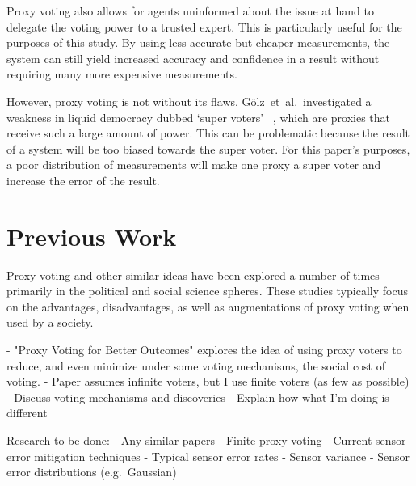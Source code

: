 Proxy voting also allows for agents uninformed about the issue at hand to
delegate the voting power to a trusted expert.
This is particularly useful for the purposes of this study.
By using less accurate but cheaper measurements, the system can still yield
increased accuracy and confidence in a result without requiring many more
expensive measurements.

However, proxy voting is not without its flaws.
Gölz~et~al.\ investigated a weakness in liquid democracy dubbed `super voters'
~\cite[para. 1.3]{Golz2021}, which are proxies that receive such a large amount
of power.
This can be problematic because the result of a system will be too biased
towards the super voter.
For this paper's purposes, a poor distribution of measurements will make one
proxy a super voter and increase the error of the result.



\section{Previous Work}\label{sec:previous-work}  %
Proxy voting and other similar ideas have been explored a number of times
primarily in the political and social science spheres\cite{Cohensius2017, Mueller1972, Zhang2022, Golz2021}.
These studies typically focus on the advantages, disadvantages, as well as
augmentations of proxy voting when used by a society.

- "Proxy Voting for Better Outcomes"\cite{Cohensius2017} explores the idea of
using proxy voters to reduce, and even minimize under some voting mechanisms,
the social cost of voting.
- Paper assumes infinite voters, but I use finite voters (as few as possible)
- Discuss voting mechanisms and discoveries
- Explain how what I'm doing is different

Research to be done:
- Any similar papers
- Finite proxy voting
- Current sensor error mitigation techniques
- Typical sensor error rates
- Sensor variance
- Sensor error distributions (e.g.\ Gaussian)

